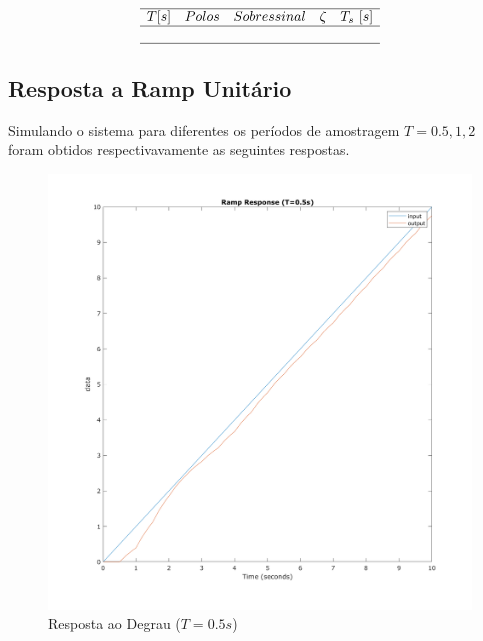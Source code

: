 \documentclass[a4paper,11pt]{article}
\begin{document}
\begin{table}[H]
    $$
    \begin{array}{ccccc}
        \hline
        T [s] & Polos & Sobressinal & \zeta & T_s\ [s] \\
        \hline
        
        \\\hline
    \end{array}
    $$
\end{table}

\subsection{Resposta a Ramp Unitário}

Simulando o sistema para diferentes os períodos de amostragem $T={0.5,1,2}$ foram obtidos respectivavamente as seguintes respostas.

\begin{figure}[H]
    \centering
    \includegraphics[width=0.8\linewidth]{img/exsim3-ramp-t500ms.png}
    \caption{ Resposta ao Degrau ($T=0.5s$)}
\end{figure}
\end{document}
